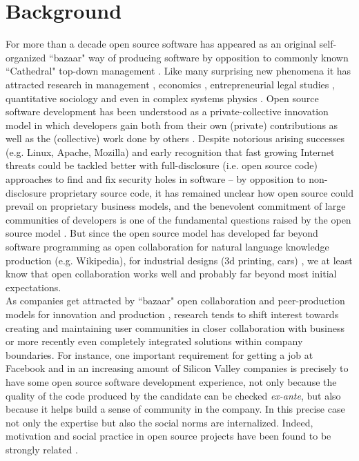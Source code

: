 \section{Background}
\label{background}
For more than a decade open source software has appeared as an original self-organized ``bazaar" way of producing software by opposition to commonly known ``Cathedral" top-down management \cite{raymond1999}. Like many surprising new phenomena it has attracted research in management \cite{vonkrogh2006pro}, economics \cite{tirole2002some}, entrepreneurial legal studies \cite{benkler2002},  quantitative sociology \cite{crowston2005social} and even in complex systems physics \cite{maillart2008,tessone2011}. Open source software development has been understood as a private-collective innovation model in which developers gain both from their own (private) contributions as well as the (collective) work done by others \cite{vonhippel2003oss}. Despite notorious arising successes (e.g. Linux, Apache, Mozilla) and early recognition that fast growing Internet threats could be tackled better with full-disclosure (i.e. open source code) approaches to find and fix security holes in software -- by opposition to non-disclosure  proprietary source code, it has remained unclear how open source could prevail on proprietary business models, and the benevolent commitment of large communities of developers is one of the fundamental questions raised by the open source model \cite{benkler2011leviathan}. But since the open source model has developed far beyond software programming as open collaboration for natural language knowledge production (e.g. Wikipedia), for industrial designs (3d printing, cars) \cite{raasch2009,pearce2012}, we at least know that open collaboration works well and probably far beyond most initial expectations. \\

\noindent As companies get attracted by  ``bazaar" open collaboration and \linebreak peer-production models for innovation and production \cite{hamel2011first}, research tends to shift interest towards creating and maintaining user communities \cite{vonHippel2001} in closer collaboration with business  \cite{bonaccorsi2004ais} or more recently even completely integrated solutions within company boundaries. For instance, one important requirement for getting a job at Facebook and in an increasing amount of Silicon Valley companies is precisely to have some open source software development experience, not only because the quality  of the code produced by the candidate can be checked {\it ex-ante}, but also because it helps build a sense of community in the company. In this precise case not only the expertise but also the social norms are internalized. Indeed, motivation and social practice in open source projects have been found to be strongly related \cite{robert2006,vonKrogh2012}.\\


